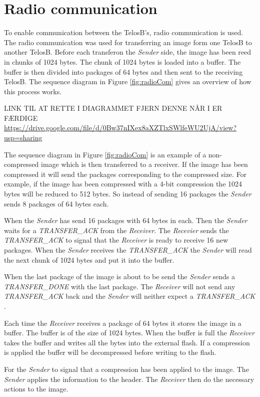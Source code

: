 \section{Radio communication}
To enable communication between the TelosB’s, radio communication is used. The radio communication was used for transferring an image form one TelosB to another TelosB. Before each transferon the \emph{Sender} side, the image has been reed in chunks of 1024 bytes. The chunk of 1024 bytes is loaded into a buffer. The buffer is then divided into packages of 64 bytes and then sent to the receiving TelosB. The sequence diagram in Figure \ref{fig:radioCom} gives an overview of how this process works.

LINK TIL AT RETTE I DIAGRAMMET FJERN DENNE NÅR I ER FÆRDIGE \url{https://drive.google.com/file/d/0Bw37nIXex8aXZTlxSWlfeWU2UjA/view?usp=sharing}


\FloatBarrier

The sequence diagram in Figure \ref{fig:radioCom} is an example of a non-compressed image which is then transferred to a receiver. If the image has been compressed it will send the packages corresponding to the compressed size. For example, if the image has been compressed with a 4-bit compression the 1024 bytes will be reduced to 512 bytes. So instead of sending 16 packages the \emph{Sender} sends 8 packages of 64 bytes each.

When the \emph{Sender} has send 16 packages with 64 bytes in each. Then the \emph{Sender} waits for a \emph{TRANSFER\_ACK } from the \emph{Receiver}. The \emph{Recevier} sends the \emph{TRANSFER\_ACK } to signal that the \emph{Receiver} is ready to receive 16 new packages. When the \emph{Sender} receives the \emph{TRANSFER\_ACK } the \emph{Sender} will read the next chunk of 1024 bytes and put it into the buffer.

When the last package of the image is about to be send the \emph{Sender} sends a \emph{TRANSFER\_DONE} with the last package. The \emph{Receiver} will not send any \emph{TRANSFER\_ACK} back and the \emph{Sender} will neither expect a \emph{TRANSFER\_ACK }.

Each time the \emph{Receiver} receives a package of 64 bytes it stores the image in a buffer. The buffer is of the size of 1024 bytes. When the buffer is full the \emph{Receiver} takes the buffer and writes all the bytes into the external flash. If a compression is applied the buffer will be decompressed before writing to the flash.

For the \emph{Sender} to signal that a compression has been applied to the image. The \emph{Sender} applies the information to the header. The \emph{Receiver} then do the necessary actions to the image.